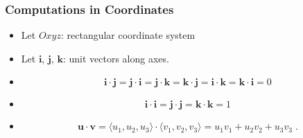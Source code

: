 \begin{frame}
\frametitle{Computations in Coordinates}
\begin{itemize}
\item<1-> Let $Oxyz$: rectangular coordinate system
\item<2-> Let $\textbf{i}$, $\textbf{j}$, $\textbf{k}$: unit vectors along axes.
\item<3->
\[ 
\textbf{i} \cdot \textbf{j} = \textbf{j} \cdot \textbf{i} = \textbf{j} \cdot \textbf{k}= \textbf{k} \cdot \textbf{j} = \textbf{i} \cdot \textbf{k} = \textbf{k} \cdot \textbf{i} = 0
\]
\item<4->
\[
\textbf{i} \cdot \textbf{i} = \textbf{j} \cdot \textbf{j} = \textbf{k} \cdot \textbf{k} = 1
\]
\item<5-> 
\begin{theorem}
\[
\textbf{u} \cdot \textbf{v} = \langle u_1, u_2, u_3 \rangle \cdot \langle v_1, v_2, v_3 \rangle =
u_1v_1 + u_2 v_2 +u_3 v_3\; .
\]
\end{theorem}
 \end{itemize}
\end{frame}

